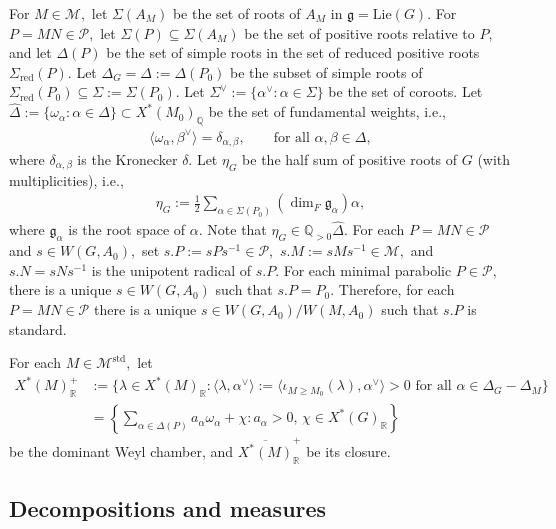 \documentclass[10pt]{amsart}
\theoremstyle{definition}
\numberwithin{equation}{section}
\numberwithin{equation}{subsection}
\newcommand{\RR}{\mathbb{R}}
\newcommand{\QQ}{\mathbb{Q}}
\begin{document}
For $M\in \mathcal{M},$ let $\Sigma(A_M)$ be the set of roots of $A_M$ in $\mathfrak{g}=\mathrm{Lie}(G).$ For $P=MN\in \mathcal{P},$ let $\Sigma(P)\subseteq \Sigma(A_M)$ be the set of positive roots relative to $P,$ and let $\Delta(P)$ be the set of simple roots in the set of reduced positive roots $\Sigma_{\mathrm{red}}(P)$. Let $\Delta_G=\Delta:=\Delta(P_0)$ be the subset of simple roots of $\Sigma_{\mathrm{red}}(P_0)\subseteq\Sigma:=\Sigma(P_0).$ Let $\Sigma^{\lor}:=\{ \alpha^\lor:\alpha\in \Sigma\}$ be the set of coroots. Let $\widehat{\Delta}:=\{\omega_\alpha:\alpha\in \Delta\}\subset X^\ast(M_0)_\QQ$ be the set of fundamental weights, i.e., 
\begin{align*}
    \langle \omega_\alpha,\beta^\lor\rangle=\delta_{\alpha,\beta}, \quad \quad \textrm{for all } \alpha,\beta\in \Delta,
\end{align*}
where $\delta_{\alpha,\beta}$ is the Kronecker $\delta$.
Let $\eta_G$ be the half sum of positive roots of $G$ (with multiplicities), i.e.,
\begin{align*}
    \eta_G:=\frac{1}{2}\sum_{\alpha\in \Sigma(P_0)} (\dim_F \mathfrak{g}_\alpha)\alpha,
\end{align*}
where $\mathfrak{g}_\alpha$ is the root space of $\alpha.$ Note that $\eta_G\in \QQ_{>0}\widehat{\Delta}.$ For each $P=MN\in \mathcal{P}$ and $s\in W(G,A_0),$ set $s.P:=sPs^{-1}\in \mathcal{P},$  $s.M:=sMs^{-1}\in \mathcal{M},$ and $s.N=sNs^{-1}$ is the unipotent radical of $s.P$. For each minimal parabolic  $P\in\mathcal{P},$ there is a unique $s\in W(G,A_0)$ such that $s. P=P_0$. Therefore, for each $P=MN\in \mathcal{P}$ there is a unique $s\in W(G,A_0)/W(M,A_0)$ such that $s.P$ is standard.

For each $M\in \mathcal{M}^{\mathrm{std}},$ let
\begin{align*}
    X^*(M)^+_\RR &:= \{\lambda\in X^*(M)_\RR : \langle \lambda,\alpha^\lor\rangle:=\langle \iota_{M\ge M_0}(\lambda),\alpha^\lor\rangle > 0\text{ for all }\alpha\in \Delta_G-\Delta_M\}\\
    &=\left\{\sum_{\alpha\in \Delta(P)} a_\alpha\omega_\alpha+\chi: a_\alpha>0,\,\chi\in X^{\ast}(G)_\RR\right\}
\end{align*}
be the dominant Weyl chamber, and $\overline{X^\ast(M)}^+_\RR$ be its closure. 



\subsection{Decompositions and measures}\label{subsec:Cartan} 
\end{document}
